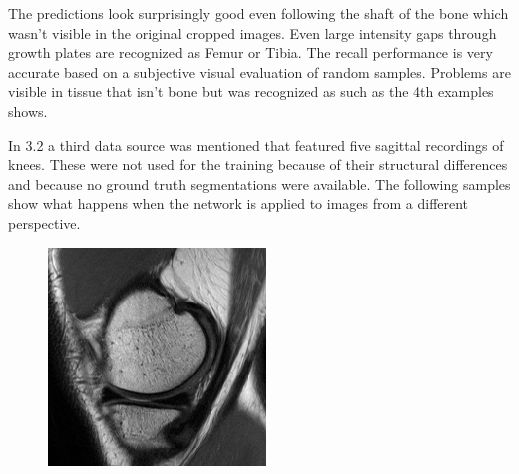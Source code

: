 The predictions look surprisingly good even following the shaft of the bone which wasn't visible in the original cropped images. Even large intensity gaps through growth plates are recognized as Femur or Tibia. The recall performance is very accurate based on a subjective visual evaluation of random samples. Problems are visible in tissue that isn't bone but was recognized as such as the 4th examples shows.

In 3.2 a third data source was mentioned that featured five sagittal recordings of knees. These were not used for the training because of their structural differences and because no ground truth segmentations were available. The following samples show what happens when the network is applied to images from a different perspective.

\begin{figure}[H]
  \includegraphics[width=\linewidth]{imgs/transfer_pers_x1.png}
\endminipage\hfill
{}

\end{figure}
